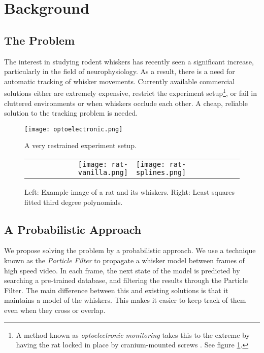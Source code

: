 \section*{Background}
\subsection*{The Problem}
The interest in studying rodent whiskers has recently seen a significant increase, particularly in the field of neurophysiology. As a result, there is a need for automatic tracking of whisker movements. Currently available commercial solutions either are extremely expensive, restrict the experiment setup\footnote{A method known as \emph{optoelectronic monitoring} takes this to the extreme by having the rat locked in place by cranium-mounted screws \cite{Optoelectronic}. See figure \ref{fig:optoelectronic}.}, or fail in cluttered environments or when whiskers occlude each other. A cheap, reliable solution to the tracking problem is needed.

\begin{figure}[h]
  \centering
  \texttt{[image: optoelectronic.png]}
  \caption{A very restrained experiment setup.}
  \label{fig:optoelectronic}
\end{figure}

\begin{figure}
  \centering
  \begin{tabular}{rl}
    \texttt{[image: rat-vanilla.png]}
    & \texttt{[image: rat-splines.png]}
    \label{fig:rat}
  \end{tabular}

  \caption{Left: Example image of a rat and its whiskers. Right: Least squares fitted third degree polynomials.}
  \label{fig:whiskers}
\end{figure}

\subsection*{A Probabilistic Approach}
We propose solving the problem by a probabilistic approach. We use a technique known as the \emph{Particle Filter} to propagate a whisker model between frames of high speed video. In each frame, the next state of the model is predicted by searching a pre-trained database, and filtering the results through the Particle Filter. The main difference between this and existing solutions is that it maintains a model of the whiskers. This makes it easier to keep track of them even when they cross or overlap.

